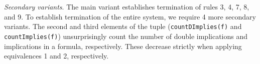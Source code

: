\documentclass[12pt]{report}
\begin{document}
%
%
%



\emph{Secondary variants}. The main variant establishes termination of
rules 3, 4, 7, 8, and 9. To establish termination of the entire
system, we require 4 more secondary variants. The second and third
elements of the tuple (\texttt{countDImplies(f)} and
\texttt{countImplies(f)}) unsurprisingly count the number of double
implications and implications in a formula, respectively. These
decrease strictly when applying equivalences 1 and 2, respectively.
\end{document}
